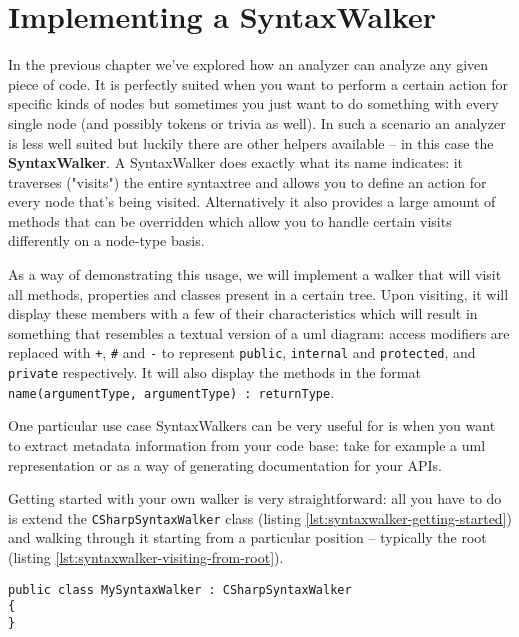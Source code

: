 \chapter{Implementing a SyntaxWalker}
\label{sec:syntaxwalker}

In the previous chapter we've explored how an analyzer can analyze any given piece of code. It is perfectly suited when you want to perform a certain action for specific kinds of nodes but sometimes you just want to do something with every single node (and possibly tokens or trivia as well). In such a scenario an analyzer is less well suited but luckily there are other helpers available -- in this case the \textbf{SyntaxWalker}. A SyntaxWalker does exactly what its name indicates: it traverses ("visits") the entire \gls{syntaxtree} and allows you to define an action for every node that's being visited. Alternatively it also provides a large amount of methods that can be overridden which allow you to handle certain visits differently on a node-type basis. 

As a way of demonstrating this usage, we will implement a walker that will visit all methods, properties and classes present in a certain tree. Upon visiting, it will display these members with a few of their characteristics which will result in something that resembles a textual version of a \gls{uml} diagram: access modifiers are replaced with \texttt{+}, \texttt{\#} and \texttt{-} to represent \texttt{public}, \texttt{internal} and \texttt{protected}, and \texttt{private} respectively. It will also display the methods in the format \texttt{name(argumentType, argumentType) : returnType}.

One particular use case SyntaxWalkers can be very useful for is when you want to extract \gls{metadata} information from your code base: take for example a \gls{uml} representation or as a way of generating documentation for your APIs.

Getting started with your own walker is very straightforward: all you have to do is extend the \texttt{CSharpSyntaxWalker} class (listing \ref{lst:syntaxwalker-getting-started}) and walking through it starting from a particular position -- typically the root (listing \ref{lst:syntaxwalker-visiting-from-root}).

\begin{lstlisting}[label={lst:syntaxwalker-getting-started}]
public class MySyntaxWalker : CSharpSyntaxWalker
{
}
\end{lstlisting}

